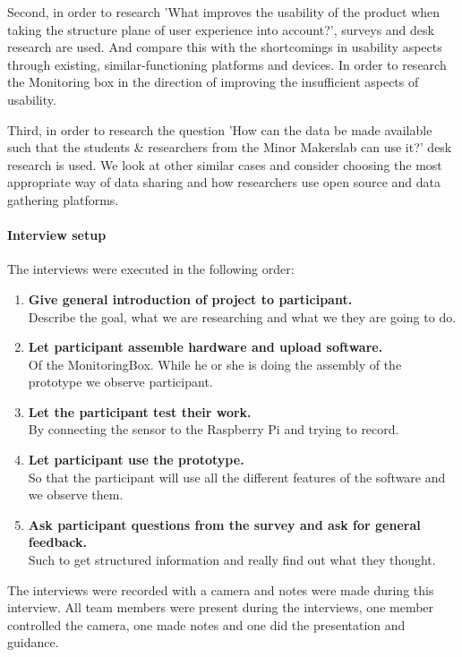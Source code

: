 \documentclass[conference]{IEEEtran}
\begin{document}
			Second, in order to research 'What improves the usability of the product when taking the structure plane of user experience into account?', surveys and desk research are used. And compare this with the shortcomings in usability aspects through existing, similar-functioning platforms and devices. In order to research the Monitoring box in the direction of improving the insufficient aspects of usability.

			Third, in order to research the question 'How can the data be made available such that the students \& researchers from the Minor Makerslab can use it?' desk research is used. We look at other similar cases and consider choosing the most appropriate way of data sharing and how researchers use open source and data gathering platforms.
		\paragraph{Interview setup} The interviews were executed in the following order:
			\begin{enumerate}
				\item \textbf{Give general introduction of project to participant.} \\
				Describe the goal, what we are researching and what we they are going to do.
				\item \textbf{Let participant assemble hardware and upload software.}\\
				Of the MonitoringBox. While he or she is doing the assembly of the prototype we observe participant.
				\item \textbf{Let the participant test their work.}\\
				By connecting the sensor to the Raspberry Pi and trying to record.
				\item \textbf{Let participant use the prototype.}\\
				So that the participant will use all the different features of the software and we observe them.
				\item \textbf{Ask participant questions from the survey and ask for general feedback.}\\
				Such to get structured information and really find out what they thought.
			\end{enumerate}
			The interviews were recorded with a camera and notes were made during this interview. All team members were present during the interviews, one member controlled the camera, one made notes and one did the presentation and guidance.
\end{document}
